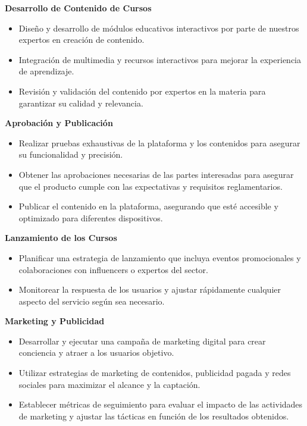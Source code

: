 \documentclass[
]{article}
\providecommand{\tightlist}{%
  \setlength{\itemsep}{0pt}\setlength{\parskip}{0pt}}
\begin{document}
\textbf{Desarrollo de Contenido de Cursos}

\begin{itemize}
\tightlist
\item
  Diseño y desarrollo de módulos educativos interactivos por parte de
  nuestros expertos en creación de contenido.
\item
  Integración de multimedia y recursos interactivos para mejorar la
  experiencia de aprendizaje.
\item
  Revisión y validación del contenido por expertos en la materia para
  garantizar su calidad y relevancia.
\end{itemize}

\textbf{Aprobación y Publicación}

\begin{itemize}
\tightlist
\item
  Realizar pruebas exhaustivas de la plataforma y los contenidos para
  asegurar su funcionalidad y precisión.
\item
  Obtener las aprobaciones necesarias de las partes interesadas para
  asegurar que el producto cumple con las expectativas y requisitos
  reglamentarios.
\item
  Publicar el contenido en la plataforma, asegurando que esté accesible
  y optimizado para diferentes dispositivos.
\end{itemize}

\textbf{Lanzamiento de los Cursos}

\begin{itemize}
\tightlist
\item
  Planificar una estrategia de lanzamiento que incluya eventos
  promocionales y colaboraciones con influencers o expertos del sector.
\item
  Monitorear la respuesta de los usuarios y ajustar rápidamente
  cualquier aspecto del servicio según sea necesario.
\end{itemize}

\textbf{Marketing y Publicidad}

\begin{itemize}
\tightlist
\item
  Desarrollar y ejecutar una campaña de marketing digital para crear
  conciencia y atraer a los usuarios objetivo.
\item
  Utilizar estrategias de marketing de contenidos, publicidad pagada y
  redes sociales para maximizar el alcance y la captación.
\item
  Establecer métricas de seguimiento para evaluar el impacto de las
  actividades de marketing y ajustar las tácticas en función de los
  resultados obtenidos.
\end{itemize}
\end{document}
